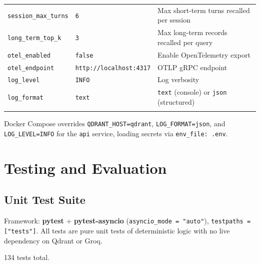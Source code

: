 \documentclass[11pt,a4paper]{report}
\newcommand{\code}[1]{\texttt{#1}}
\begin{document}
\begin{longtable}{@{}p{4.2cm}p{3.6cm}p{5.8cm}@{}}
\code{session\_max\_turns} & \code{6} & Max short-term turns recalled per session \\
\code{long\_term\_top\_k} & \code{3} & Max long-term records recalled per query \\
\code{otel\_enabled} & \code{false} & Enable OpenTelemetry export \\
\code{otel\_endpoint} & \code{http://localhost:4317} & OTLP gRPC endpoint \\
\code{log\_level} & \code{INFO} & Log verbosity \\
\code{log\_format} & \code{text} & \code{text} (console) or \code{json} (structured) \\
\bottomrule
\label{tab:config}
\end{longtable}

Docker Compose overrides \code{QDRANT\_HOST=qdrant}, \code{LOG\_FORMAT=json}, and
\code{LOG\_LEVEL=INFO} for the \code{api} service, loading secrets via
\code{env\_file: .env}.

\chapter{Testing and Evaluation}

\section{Unit Test Suite}

Framework: \textbf{pytest} + \textbf{pytest-asyncio}
(\code{asyncio\_mode = "auto"}), \code{testpaths = ["tests"]}. All tests are pure unit
tests of deterministic logic with no live dependency on Qdrant or Groq.

134 tests total.
\end{document}
